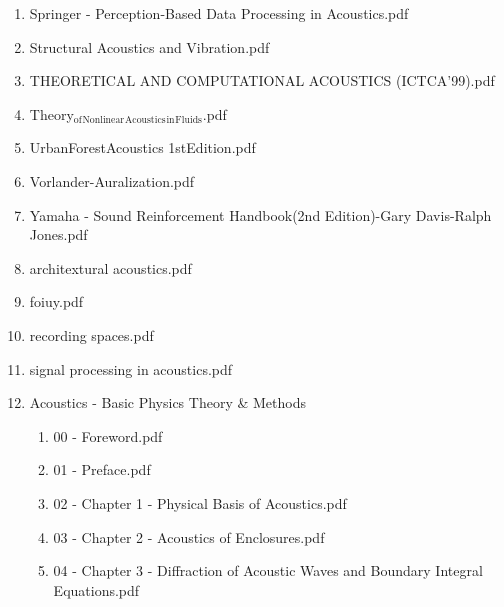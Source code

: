 \documentclass[11pt]{article}
\begin{document}
\begin{enumerate}
\item Springer - Perception-Based Data Processing in Acoustics.pdf
\label{sec-1-1-1-1-11-19-23-16}

\item Structural Acoustics and Vibration.pdf
\label{sec-1-1-1-1-11-19-23-17}

\item THEORETICAL AND COMPUTATIONAL ACOUSTICS (ICTCA'99).pdf
\label{sec-1-1-1-1-11-19-23-18}

\item Theory$_{\text{of}}$$_{\text{Nonlinear}}$$_{\text{Acoustics}}$$_{\text{in}}$$_{\text{Fluids}}$.pdf
\label{sec-1-1-1-1-11-19-23-19}

\item UrbanForestAcoustics 1stEdition.pdf
\label{sec-1-1-1-1-11-19-23-20}

\item Vorlander-Auralization.pdf
\label{sec-1-1-1-1-11-19-23-21}

\item Yamaha - Sound Reinforcement Handbook(2nd Edition)-Gary Davis-Ralph Jones.pdf
\label{sec-1-1-1-1-11-19-23-22}

\item architextural acoustics.pdf
\label{sec-1-1-1-1-11-19-23-23}

\item foiuy.pdf
\label{sec-1-1-1-1-11-19-23-24}

\item recording spaces.pdf
\label{sec-1-1-1-1-11-19-23-25}

\item signal processing in acoustics.pdf
\label{sec-1-1-1-1-11-19-23-26}

\item Acoustics - Basic Physics Theory \& Methods
\label{sec-1-1-1-1-11-19-23-27}
\begin{enumerate}
\item 00 - Foreword.pdf
\label{sec-1-1-1-1-11-19-23-27-1}

\item 01 - Preface.pdf
\label{sec-1-1-1-1-11-19-23-27-2}

\item 02 - Chapter 1 - Physical Basis of Acoustics.pdf
\label{sec-1-1-1-1-11-19-23-27-3}

\item 03 - Chapter 2 - Acoustics of Enclosures.pdf
\label{sec-1-1-1-1-11-19-23-27-4}

\item 04 - Chapter 3 - Diffraction of Acoustic Waves and Boundary Integral Equations.pdf
\label{sec-1-1-1-1-11-19-23-27-5}


\end{enumerate}
\end{enumerate}
\end{document}
